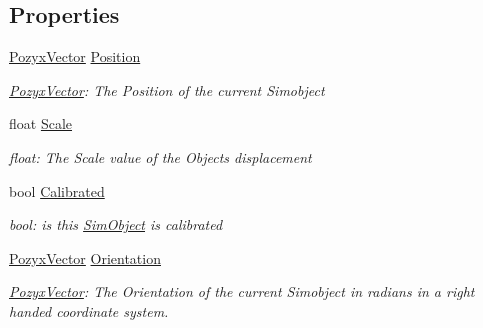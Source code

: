 \subsection*{Properties}
\begin{DoxyCompactItemize}
\item 
\hyperlink{struct_pozyx_positioner_1_1_framework_1_1_pozyx_vector}{Pozyx\+Vector} \hyperlink{class_pozyx_positioner_1_1_framework_1_1_sim_object_a1d2b2ac8c37883939483d4682826db21}{Position}
\begin{DoxyCompactList}\small\item\em \hyperlink{struct_pozyx_positioner_1_1_framework_1_1_pozyx_vector}{Pozyx\+Vector}\+: The Position of the current Simobject \end{DoxyCompactList}\item 
float \hyperlink{class_pozyx_positioner_1_1_framework_1_1_sim_object_ab9f89c4e327e25286f0269960d0d2de8}{Scale}
\begin{DoxyCompactList}\small\item\em float\+: The Scale value of the Object\textquotesingle{}s displacement \end{DoxyCompactList}\item 
bool \hyperlink{class_pozyx_positioner_1_1_framework_1_1_sim_object_a6bcf32032872002b9edb17f0efc86eef}{Calibrated}
\begin{DoxyCompactList}\small\item\em bool\+: is this \hyperlink{class_pozyx_positioner_1_1_framework_1_1_sim_object}{Sim\+Object} is calibrated \end{DoxyCompactList}\item 
\hyperlink{struct_pozyx_positioner_1_1_framework_1_1_pozyx_vector}{Pozyx\+Vector} \hyperlink{class_pozyx_positioner_1_1_framework_1_1_sim_object_af589d7d7066efe823f8a2decd5b081da}{Orientation}
\begin{DoxyCompactList}\small\item\em \hyperlink{struct_pozyx_positioner_1_1_framework_1_1_pozyx_vector}{Pozyx\+Vector}\+: The Orientation of the current Simobject in radians in a right handed coordinate system. \end{DoxyCompactList}\end{DoxyCompactItemize}


